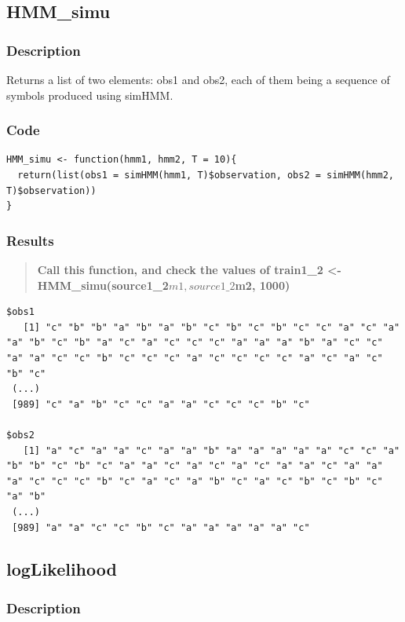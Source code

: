 \documentclass[a4paper]{article}
\begin{document}
\subsection{HMM\_simu}

\subsubsection{Description}

Returns a list of two elements: obs1 and obs2, each of them being a sequence of symbols produced using simHMM.

\subsubsection{Code}

\begin{lstlisting}
HMM_simu <- function(hmm1, hmm2, T = 10){
  return(list(obs1 = simHMM(hmm1, T)$observation, obs2 = simHMM(hmm2, T)$observation))
}
\end{lstlisting}

\subsubsection{Results}

\begin{quotation}
\textbf{Call this function, and check the values of train1\_2 <- HMM\_simu(source1\_2$m1, source1\_2$m2, 1000)}
\end{quotation}

\begin{lstlisting}
$obs1
   [1] "c" "b" "b" "a" "b" "a" "b" "c" "b" "c" "b" "c" "c" "a" "c" "a" "a" "b" "c" "b" "a" "c" "a" "c" "c" "c" "a" "a" "a" "b" "a" "c" "c" "a" "a" "c" "c" "b" "c" "c" "c" "a" "c" "c" "c" "c" "a" "c" "a" "c" "b" "c"
 (...)
 [989] "c" "a" "b" "c" "c" "a" "a" "c" "c" "c" "b" "c"

$obs2
   [1] "a" "c" "a" "a" "c" "a" "a" "b" "a" "a" "a" "a" "a" "c" "c" "a" "b" "b" "c" "b" "c" "a" "a" "c" "a" "c" "a" "c" "a" "a" "c" "a" "a" "a" "c" "c" "c" "b" "c" "a" "c" "a" "b" "c" "a" "c" "b" "c" "b" "c" "a" "b"
 (...)
 [989] "a" "a" "c" "c" "b" "c" "a" "a" "a" "a" "a" "c"
\end{lstlisting}

\subsection{logLikelihood}

\subsubsection{Description}
\end{document}
